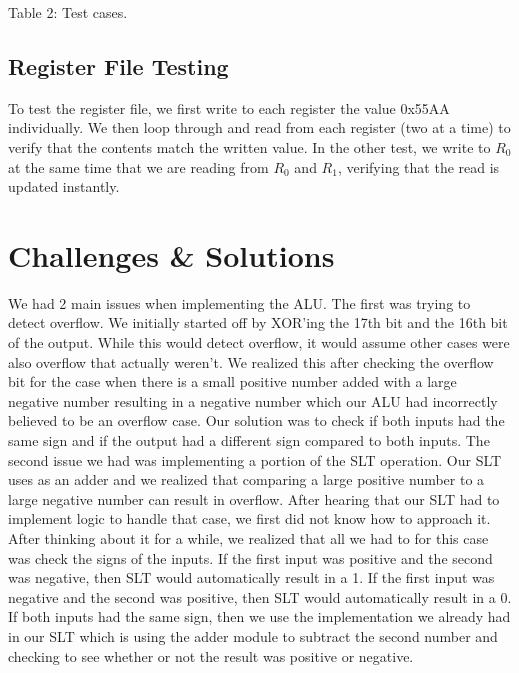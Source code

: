 \documentclass[11pt]{article}
\begin{document}
\vspace{12pt}
Table 2: Test cases.

\subsection{Register File Testing}
To test the register file, we first write to each register the value 0x55AA individually. We then loop through and read from each register (two at a time) to verify that the contents match the written value. In the other test, we write to $R_0$ at the same time that we are reading from $R_0$ and $R_1$, verifying that the read is updated instantly. 

\section{Challenges \& Solutions}
We had 2 main issues when implementing the ALU. The first was trying to detect overflow. We initially started off by XOR'ing the 17th bit and the 16th bit of the output. While this would detect overflow, it would assume other cases were also overflow that actually weren't. We realized this after checking the overflow bit for the case when there is a small positive number added with a large negative number resulting in a negative number which our ALU had incorrectly believed to be an overflow case. Our solution was to check if both inputs had the same sign and if the output had a different sign compared to both inputs. The second issue we had was implementing a portion of the SLT operation. Our SLT uses as an adder and we realized that comparing a large positive number to a large negative number can result in overflow. After hearing that our SLT had to implement logic to handle that case, we first did not know how to approach it. After thinking about it for a while, we realized that all we had to for this case was check the signs of the inputs. If the first input was positive and the second was negative, then SLT would automatically result in a 1. If the first input was negative and the second was positive, then SLT would automatically result in a 0. If both inputs had the same sign, then we use the implementation we already had in our SLT which is using the adder module to subtract the second number and checking to see whether or not the result was positive or negative.
\end{document}
